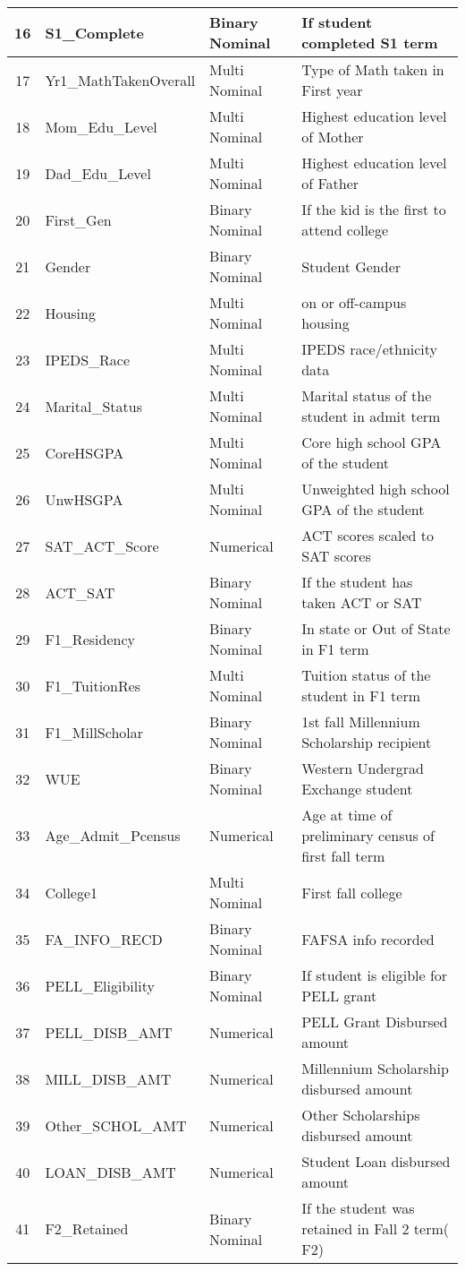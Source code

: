 \documentclass[11pt,openright]{report}
\begin{document}
\begin{longtable}{|c|l|l|l|}
		16 	&S1\_Complete		&	Binary	Nominal	&	If student completed S1 term			\\ \hline
		17	&Yr1\_MathTakenOverall & Multi Nominal		&	Type of Math taken in First year			\\ \hline
		18 	&Mom\_Edu\_Level		&	Multi Nominal		&	Highest education level of Mother		\\ \hline
		19 	&Dad\_Edu\_Level		&	Multi Nominal		&	Highest education level of Father			\\ \hline
		20 	&First\_Gen			&	Binary Nominal	&	If the kid is the first to attend college		\\ \hline
		21 	&Gender			&	Binary Nominal	&	Student Gender					\\ \hline
		22 	&Housing			&	Multi Nominal		&	on or off-campus housing				\\ \hline
		23 	&IPEDS\_Race		&	Multi Nominal		&	IPEDS race/ethnicity data				\\ \hline
		24 	&Marital\_Status		&	Multi Nominal		&	Marital status of the student in admit term	\\ \hline
		25 	&CoreHSGPA			&	Multi Nominal		&	Core high school GPA of the student		\\ \hline
		26 	&UnwHSGPA			&	Multi Nominal		&	Unweighted high school GPA of the student	\\ \hline
		27 	&SAT\_ACT\_Score		&	Numerical		&	ACT scores scaled to SAT scores			\\ \hline
		28 	&ACT\_SAT			&	Binary Nominal	&	If the student has taken ACT or SAT		\\ \hline
		29 	&F1\_Residency		&	Binary Nominal	&	In state or Out of State in F1 term		\\ \hline
		30 	&F1\_TuitionRes		&	Multi Nominal		&	Tuition status of the student in F1 term \\ \hline
		31	&F1\_MillScholar		&	Binary Nominal		& 	1st fall Millennium Scholarship recipient  \\ \hline
		32	&WUE				&	Binary Nominal		&	Western Undergrad Exchange student  \\ \hline
		33	&Age\_Admit\_Pcensus	&	Numerical			&	Age at time of preliminary census of first fall term \\ \hline
		34	&College1				& Multi Nominal			& 	First fall college			\\ \hline
		35	&FA\_INFO\_RECD		&Binary Nominal		&	FAFSA info recorded		\\ \hline
		36	&PELL\_Eligibility		&Binary Nominal		&	If student is eligible for PELL grant \\ \hline
		37	&PELL\_DISB\_AMT &Numerical			&	PELL Grant Disbursed amount \\ \hline
		38	&MILL\_DISB\_AMT		& Numerical			&	Millennium Scholarship disbursed amount	  \\ \hline
		39	&Other\_SCHOL\_AMT & Numerical		&   	Other Scholarships disbursed amount \\ \hline
		40	&LOAN\_DISB\_AMT	&Numerical	&	Student Loan disbursed amount 	\\ \hline
		41	& F2\_Retained			&Binary Nominal &	If the student was retained in Fall 2 term( F2)

\end{longtable}
 
\end{document}

